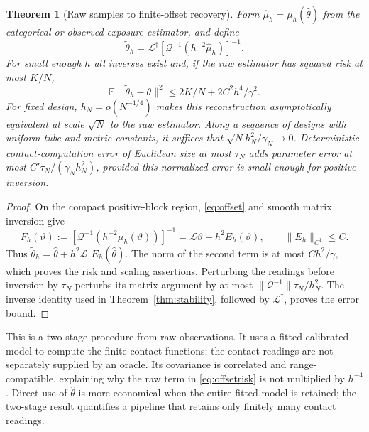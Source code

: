 \documentclass[11pt,reqno]{amsart}
\numberwithin{equation}{section}
\newtheorem{theorem}{Theorem}[section]
\theoremstyle{definition}\newtheorem{definition}[theorem]{Definition}
\theoremstyle{remark}\newtheorem{remark}[theorem]{Remark}
\newcommand{\LL}{\mathcal L}
\begin{document}
\begin{theorem}[Raw samples to finite-offset recovery]\label{thm:offset}
Form $\widehat\mu_h=\mu_h(\widehat\theta)$ from the categorical or observed-exposure estimator, and define
\[
 \widetilde\theta_h=\LL^\dagger
       \left[\mathcal Q^{-1}(h^{-2}\widehat\mu_h)\right]^{-1}.
\]
For small enough $h$ all inverses exist and, if the raw estimator has squared risk at most $K/N$,
\begin{equation}\label{eq:offsetrisk}
 \mathbb E\|\widetilde\theta_h-\theta\|^2
       \le 2K/N+2C^2h^4/\gamma^2.
\end{equation}
For fixed design, $h_N=o(N^{-1/4})$ makes this reconstruction asymptotically equivalent at scale $\sqrt N$ to the raw estimator. Along a sequence of designs with uniform tube and metric constants, it suffices that $\sqrt N h_N^2/\gamma_N\to0$. Deterministic contact-computation error of Euclidean size at most $\tau_N$ adds parameter error at most $C'\tau_N/(\gamma_Nh_N^2)$, provided this normalized error is small enough for positive inversion.
\end{theorem}
\begin{proof}
On the compact positive-block region, \eqref{eq:offset} and smooth matrix inversion give
\[
 F_h(\vartheta):=
 [\mathcal Q^{-1}(h^{-2}\mu_h(\vartheta))]^{-1}
       =\LL\vartheta+h^2E_h(\vartheta),\qquad \|E_h\|_{C^1}\le C.
\]
Thus $\widetilde\theta_h=\widehat\theta+h^2\LL^\dagger E_h(\widehat\theta)$. The norm of the second term is at most $Ch^2/\gamma$, which proves the risk and scaling assertions. Perturbing the readings before inversion by $\tau_N$ perturbs its matrix argument by at most $\|\mathcal Q^{-1}\|\tau_N/h_N^2$. The inverse identity used in Theorem~\ref{thm:stability}, followed by $\LL^\dagger$, proves the error bound.
\end{proof}
This is a two-stage procedure from raw observations. It uses a fitted calibrated model to compute the finite contact functions; the contact readings are not separately supplied by an oracle. Its covariance is correlated and range-compatible, explaining why the raw term in \eqref{eq:offsetrisk} is not multiplied by $h^{-4}$. Direct use of $\widehat\theta$ is more economical when the entire fitted model is retained; the two-stage result quantifies a pipeline that retains only finitely many contact readings.

\appendix
\end{document}
